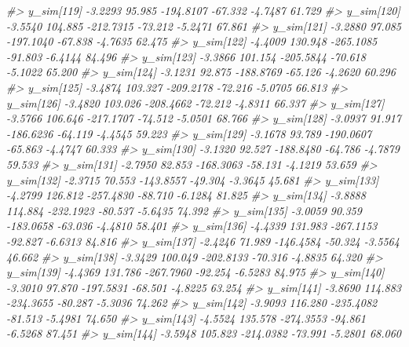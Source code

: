 \documentclass[
  10pt,
  italian,
  a4paper,
  extrafontsizes,onecolumn,openright
  ]{memoir}
\newenvironment{Shaded}{\begin{snugshade}}{\end{snugshade}}
\newcommand{\CommentTok}[1]{\textcolor[rgb]{0.56,0.35,0.01}{\textit{#1}}}
\begin{document}
\begin{Shaded}
\begin{Highlighting}[]
\CommentTok{\#\textgreater{}   y\_sim[119] {-}3.2293  95.985 {-}194.8107 {-}67.332 {-}4.7487 61.729}
\CommentTok{\#\textgreater{}   y\_sim[120] {-}3.5540 104.885 {-}212.7315 {-}73.212 {-}5.2471 67.861}
\CommentTok{\#\textgreater{}   y\_sim[121] {-}3.2880  97.085 {-}197.1040 {-}67.838 {-}4.7635 62.475}
\CommentTok{\#\textgreater{}   y\_sim[122] {-}4.4009 130.948 {-}265.1085 {-}91.803 {-}6.4144 84.496}
\CommentTok{\#\textgreater{}   y\_sim[123] {-}3.3866 101.154 {-}205.5844 {-}70.618 {-}5.1022 65.200}
\CommentTok{\#\textgreater{}   y\_sim[124] {-}3.1231  92.875 {-}188.8769 {-}65.126 {-}4.2620 60.296}
\CommentTok{\#\textgreater{}   y\_sim[125] {-}3.4874 103.327 {-}209.2178 {-}72.216 {-}5.0705 66.813}
\CommentTok{\#\textgreater{}   y\_sim[126] {-}3.4820 103.026 {-}208.4662 {-}72.212 {-}4.8311 66.337}
\CommentTok{\#\textgreater{}   y\_sim[127] {-}3.5766 106.646 {-}217.1707 {-}74.512 {-}5.0501 68.766}
\CommentTok{\#\textgreater{}   y\_sim[128] {-}3.0937  91.917 {-}186.6236 {-}64.119 {-}4.4545 59.223}
\CommentTok{\#\textgreater{}   y\_sim[129] {-}3.1678  93.789 {-}190.0607 {-}65.863 {-}4.4747 60.333}
\CommentTok{\#\textgreater{}   y\_sim[130] {-}3.1320  92.527 {-}188.8480 {-}64.786 {-}4.7879 59.533}
\CommentTok{\#\textgreater{}   y\_sim[131] {-}2.7950  82.853 {-}168.3063 {-}58.131 {-}4.1219 53.659}
\CommentTok{\#\textgreater{}   y\_sim[132] {-}2.3715  70.553 {-}143.8557 {-}49.304 {-}3.3645 45.681}
\CommentTok{\#\textgreater{}   y\_sim[133] {-}4.2799 126.812 {-}257.4830 {-}88.710 {-}6.1284 81.825}
\CommentTok{\#\textgreater{}   y\_sim[134] {-}3.8888 114.884 {-}232.1923 {-}80.537 {-}5.6435 74.392}
\CommentTok{\#\textgreater{}   y\_sim[135] {-}3.0059  90.359 {-}183.0658 {-}63.036 {-}4.4810 58.401}
\CommentTok{\#\textgreater{}   y\_sim[136] {-}4.4339 131.983 {-}267.1153 {-}92.827 {-}6.6313 84.816}
\CommentTok{\#\textgreater{}   y\_sim[137] {-}2.4246  71.989 {-}146.4584 {-}50.324 {-}3.5564 46.662}
\CommentTok{\#\textgreater{}   y\_sim[138] {-}3.3429 100.049 {-}202.8133 {-}70.316 {-}4.8835 64.320}
\CommentTok{\#\textgreater{}   y\_sim[139] {-}4.4369 131.786 {-}267.7960 {-}92.254 {-}6.5283 84.975}
\CommentTok{\#\textgreater{}   y\_sim[140] {-}3.3010  97.870 {-}197.5831 {-}68.501 {-}4.8225 63.254}
\CommentTok{\#\textgreater{}   y\_sim[141] {-}3.8690 114.883 {-}234.3655 {-}80.287 {-}5.3036 74.262}
\CommentTok{\#\textgreater{}   y\_sim[142] {-}3.9093 116.280 {-}235.4082 {-}81.513 {-}5.4981 74.650}
\CommentTok{\#\textgreater{}   y\_sim[143] {-}4.5524 135.578 {-}274.3553 {-}94.861 {-}6.5268 87.451}
\CommentTok{\#\textgreater{}   y\_sim[144] {-}3.5948 105.823 {-}214.0382 {-}73.991 {-}5.2801 68.060}

\end{Highlighting}
\end{Shaded}
\end{document}

